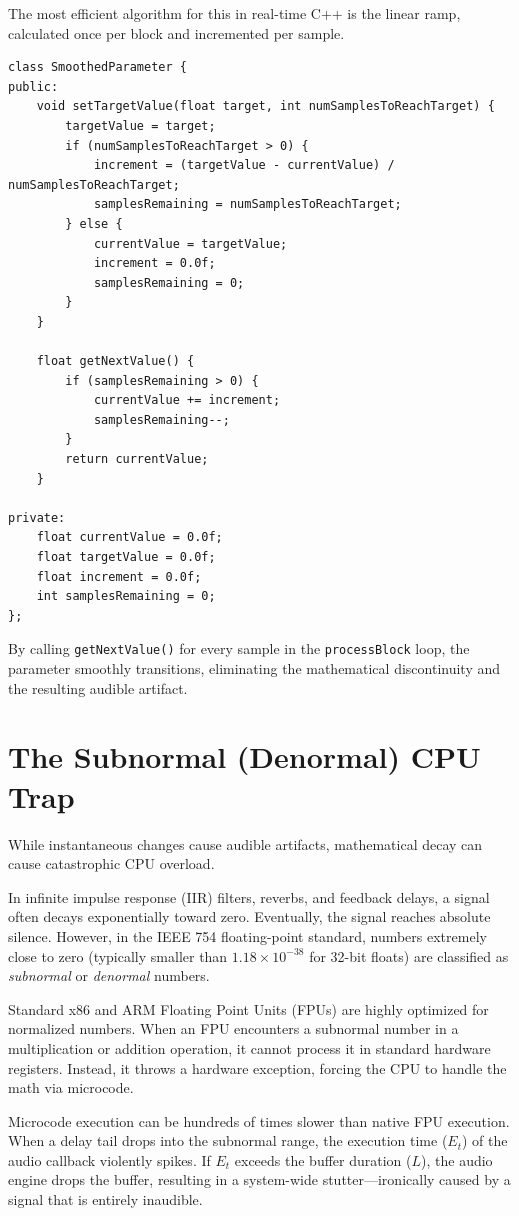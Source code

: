 \documentclass[11pt,a4paper]{article}
\begin{document}
The most efficient algorithm for this in real-time C++ is the linear ramp, calculated once per block and incremented per sample.

\begin{verbatim}
class SmoothedParameter {
public:
    void setTargetValue(float target, int numSamplesToReachTarget) {
        targetValue = target;
        if (numSamplesToReachTarget > 0) {
            increment = (targetValue - currentValue) / numSamplesToReachTarget;
            samplesRemaining = numSamplesToReachTarget;
        } else {
            currentValue = targetValue;
            increment = 0.0f;
            samplesRemaining = 0;
        }
    }

    float getNextValue() {
        if (samplesRemaining > 0) {
            currentValue += increment;
            samplesRemaining--;
        }
        return currentValue;
    }

private:
    float currentValue = 0.0f;
    float targetValue = 0.0f;
    float increment = 0.0f;
    int samplesRemaining = 0;
};
\end{verbatim}

By calling \texttt{getNextValue()} for every sample in the \texttt{processBlock} loop, the parameter smoothly transitions, eliminating the mathematical discontinuity and the resulting audible artifact.

\section{The Subnormal (Denormal) CPU Trap}
While instantaneous changes cause audible artifacts, mathematical decay can cause catastrophic CPU overload. 

In infinite impulse response (IIR) filters, reverbs, and feedback delays, a signal often decays exponentially toward zero. Eventually, the signal reaches absolute silence. However, in the IEEE 754 floating-point standard, numbers extremely close to zero (typically smaller than $1.18 \times 10^{-38}$ for 32-bit floats) are classified as \textit{subnormal} or \textit{denormal} numbers.

Standard x86 and ARM Floating Point Units (FPUs) are highly optimized for normalized numbers. When an FPU encounters a subnormal number in a multiplication or addition operation, it cannot process it in standard hardware registers. Instead, it throws a hardware exception, forcing the CPU to handle the math via microcode. 

Microcode execution can be hundreds of times slower than native FPU execution. When a delay tail drops into the subnormal range, the execution time ($E_t$) of the audio callback violently spikes. If $E_t$ exceeds the buffer duration ($L$), the audio engine drops the buffer, resulting in a system-wide stutter---ironically caused by a signal that is entirely inaudible.
\end{document}
